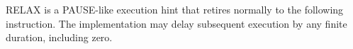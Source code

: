 RELAX is a PAUSE-like execution hint that retires normally to the following instruction. The implementation may delay
subsequent execution by any finite duration, including zero.
